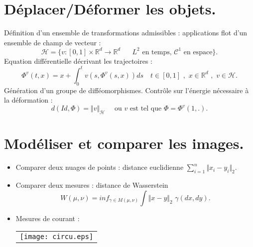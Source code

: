 \documentclass[a0,portrait]{a0poster}
\newcommand\R{{\mathbb R}}
\newcommand{\subtitle}[1]{\section*{#1}}
\newcommand{\norme}[2]{\Vert #1 \Vert_{#2}}
\begin{document}
\begin{multicols}{2}

\subtitle{Déplacer/Déformer les objets. }

Définition d'un ensemble de transformations admissibles : applications flot d'un ensemble de champ de vecteur :
$$
\mathcal{H} = \{ v : [0,1]\times\R^d \rightarrow \R^d \quad \text{ $L^2$ en temps, $\mathcal{C}^1$ en espace}\}.
$$
Equation différentielle décrivant les trajectoires :
$$
\Phi^v(t,x) = x + \int_0^t v(s,\Phi^v(s,x))ds \quad t \in [0,1]\,\, , \,\, x \in \R^d \,\, , \,\, v\in \mathcal{H}.
$$
Génération d'un groupe de difféomorphismes. Contrôle sur l'énergie nécessaire à la déformation :
$$
d(Id,\Phi)=\norme{v}{\mathcal{H}} \quad \text{ ou $v$ est tel que $\Phi=\Phi^v(1,.)$.} 
$$

\vspace{2em}

\subtitle{Modéliser et comparer les images. }

\begin{itemize}
\item Comparer deux nuages de points : distance euclidienne $\sum_{i=1}^n\norme{x_i - y_i}{2}$.
\item Comparer deux mesures : distance de Wasserstein
$$
W(\mu,\nu) = inf_{\gamma \in M(\mu,\nu)} \int \norme{x-y}{2} \,\, \gamma(dx,dy).
$$
\item Mesures de courant : \begin{minipage}[H]{10cm}  
\hspace{5cm}
\begin{center}
\begin{tabular}{c}
 \texttt{[image: circu.eps]}\\[.3cm] %
\end{tabular}
\end{center}      \end{minipage}

\end{itemize}
\end{multicols}
\end{document}
